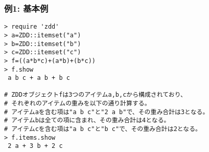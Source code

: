 \subsubsection*{例1: 基本例}



\begin{Verbatim}[baselinestretch=0.7,frame=single]
> require 'zdd'
> a=ZDD::itemset("a")
> b=ZDD::itemset("b")
> c=ZDD::itemset("c")
> f=((a*b*c)+(a*b)+(b*c))
> f.show
 a b c + a b + b c

# ZDDオブジェクトfは3つのアイテムa,b,cから構成されており、
# それぞれのアイテムの重みを以下の通り計算する。
# アイテムaを含む項は"a b c"と"2 a b"で、その重み合計は3となる。
# アイテムbは全ての項に含まれ、その重み合計は4となる。
# アイテムcを含む項は"a b c"と"b c"で、その重み合計は2となる。
> f.items.show
 2 a + 3 b + 2 c
\end{Verbatim}
